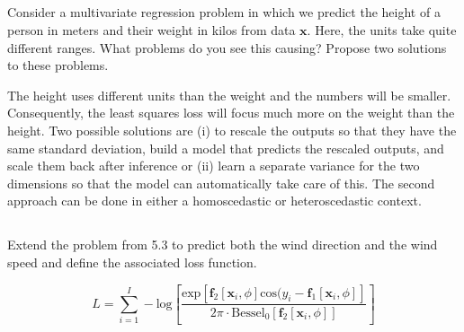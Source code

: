 \documentclass[12pt]{report}
\begin{document}
\subsection{}
\begin{mdframed}
    Consider a multivariate regression problem in which we predict the height of a person in meters and their weight in kilos from data $\mathbf{x}$. Here, the units take quite different ranges. What problems do you see this causing? Propose two solutions to these problems.
\end{mdframed}

The height uses different units than the weight and the numbers will be smaller. Consequently, the least squares loss will focus much more on the weight than the height. Two possible solutions are (i) to rescale the outputs so that they have the same standard deviation, build a model that predicts the rescaled outputs, and scale them back after inference or (ii) learn a separate variance for the two dimensions so that the model can automatically take care of this. The second approach can be done in either a homoscedastic or heteroscedastic context.

\subsection{}
\begin{mdframed}
    Extend the problem from 5.3 to predict both the wind direction and the wind speed and define the associated loss function.
\end{mdframed}

\begin{equation*}
    L = \sum^{I}_{i=1} - \text{log}\left[\frac{\text{exp}[\mathbf{f}_{2}[\mathbf{x}_{i}, \phi]\text{cos}(y_{i}-\mathbf{f}_{1}[\mathbf{x}_{i}, \phi]]}{2\pi \cdot \text{Bessel}_{0}[\mathbf{f}_{2}[\mathbf{x}_{i}, \phi]]}\right]
\end{equation*}
\end{document}
